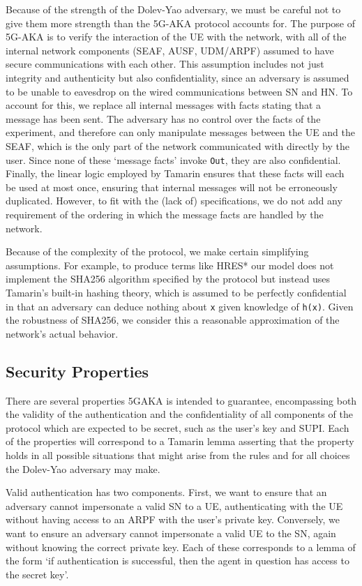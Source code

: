 \documentclass[10pt, pdftex]{article}
\begin{document}
Because of the strength of the Dolev-Yao adversary, we must be careful not to give them more strength than the 5G-AKA protocol accounts for. The purpose of 5G-AKA is to verify the interaction of the UE with the network, with all of the internal network components (SEAF, AUSF, UDM/ARPF) assumed to have secure communications with each other. This assumption includes not just integrity and authenticity but also confidentiality, since an adversary is assumed to be unable to eavesdrop on the wired communications between SN and HN. To account for this, we replace all internal messages with facts stating that a message has been sent. The adversary has no control over the facts of the experiment, and therefore can only manipulate messages between the UE and the SEAF, which is the only part of the network communicated with directly by the user. Since none of these `message facts' invoke \verb|Out|, they are also confidential. Finally, the linear logic employed by Tamarin ensures that these facts will each be used at most once, ensuring that internal messages will not be erroneously duplicated. However, to fit with the (lack of) specifications, we do not add any requirement of the ordering in which the message facts are handled by the network.

Because of the complexity of the protocol, we make certain simplifying assumptions. For example, to produce terms like HRES* our model does not implement the SHA256 algorithm specified by the protocol but instead uses Tamarin's built-in hashing theory, which is assumed to be perfectly confidential in that an adversary can deduce nothing about \verb|x| given knowledge of \verb|h(x)|. Given the robustness of SHA256, we consider this a reasonable approximation of the network's actual behavior.

\subsection{Security Properties}

There are several properties 5GAKA is intended to guarantee, encompassing both the validity of the authentication and the confidentiality of all components of the protocol which are expected to be secret, such as the user's key and SUPI. Each of the properties will correspond to a Tamarin lemma asserting that the property holds in all possible situations that might arise from the rules and for all choices the Dolev-Yao adversary may make.

Valid authentication has two components. First, we want to ensure that an adversary cannot impersonate a valid SN to a UE, authenticating with the UE without having access to an ARPF with the user's private key. Conversely, we want to ensure an adversary cannot impersonate a valid UE to the SN, again without knowing the correct private key. Each of these corresponds to a lemma of the form `if authentication is successful, then the agent in question has access to the secret key'.
\end{document}

